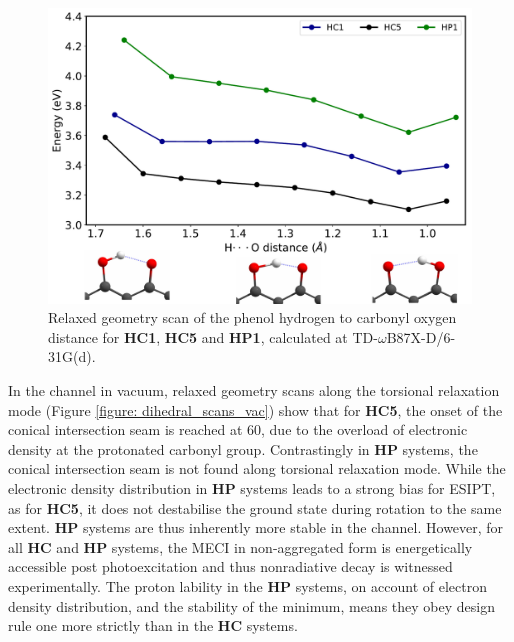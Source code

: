 \begin{figure}[t]
\centering
  \includegraphics[width=0.8\linewidth]{5ConnectingCrystalStructure/Hscan}
  \caption[Relaxed geometry scan for ESIPT process.]{Relaxed geometry scan of the phenol hydrogen to carbonyl oxygen distance for \textbf{HC1}, \textbf{HC5} and \textbf{HP1}, calculated at TD-$\omega$B87X-D/6-31G(d).}
  \label{figure: Hscan}
\end{figure}

In the \Kstar{} channel in vacuum, relaxed geometry scans along the torsional relaxation mode (Figure \ref{figure: dihedral_scans_vac}) show that for \textbf{HC5}, the onset of the conical intersection seam is reached at 60\degree, due to the overload of electronic density at the protonated carbonyl group. Contrastingly in \textbf{HP} systems, the conical intersection seam is not found along torsional relaxation mode. While the electronic density distribution in \textbf{HP} systems leads to a strong bias for ESIPT, as for \textbf{HC5}, it does not destabilise the ground state during rotation to the same extent. \textbf{HP} systems are thus inherently more stable in the \Kstar{} channel. However, for all \textbf{HC} and \textbf{HP} systems, the MECI in non-aggregated form is energetically accessible post photoexcitation and thus nonradiative decay is witnessed experimentally. The proton lability in the \textbf{HP} systems, on account of electron density distribution, and the stability of the \Kstar{} minimum, means they obey design rule one more strictly than in the \textbf{HC} systems. 


